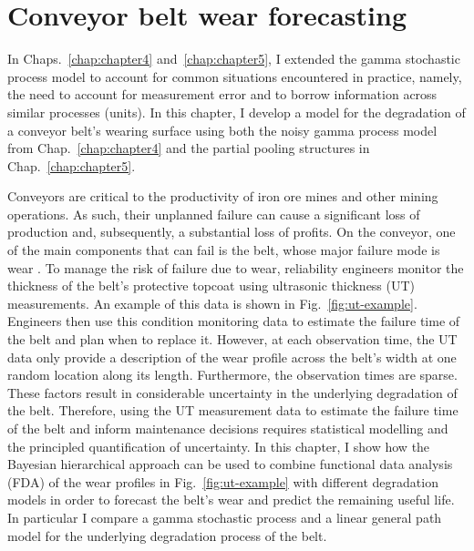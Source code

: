 \chapter{Conveyor belt wear forecasting} \label{chap:chapter6}

In Chaps.~\ref{chap:chapter4} and~\ref{chap:chapter5}, I extended the gamma stochastic process model to account for common situations encountered in practice, namely, the need to account for measurement error and to borrow information across similar processes (units). In this chapter, I develop a model for the degradation of a conveyor belt's wearing surface using both the noisy gamma process model from Chap.~\ref{chap:chapter4} and the partial pooling structures in Chap.~\ref{chap:chapter5}.

Conveyors are critical to the productivity of iron ore mines and other mining operations. As such, their unplanned failure can cause a significant loss of production and, subsequently, a substantial loss of profits. On the conveyor, one of the main components that can fail is the belt, whose major failure mode is wear \citep{bortnowski_2022}. To manage the risk of failure due to wear, reliability engineers monitor the thickness of the belt's protective topcoat using ultrasonic thickness (UT) measurements. An example of this data is shown in Fig.~\ref{fig:ut-example}. Engineers then use this condition monitoring data to estimate the failure time of the belt and plan when to replace it. However, at each observation time, the UT data only provide a description of the wear profile across the belt's width at one random location along its length. Furthermore, the observation times are sparse. These factors result in considerable uncertainty in the underlying degradation of the belt. Therefore, using the UT measurement data to estimate the failure time of the belt and inform maintenance decisions requires statistical modelling and the principled quantification of uncertainty. In this chapter, I show how the Bayesian hierarchical approach can be used to combine functional data analysis (FDA) of the wear profiles in Fig.~\ref{fig:ut-example} with different degradation models in order to forecast the belt's wear and predict the remaining useful life. In particular I compare a gamma stochastic process and a linear general path model for the underlying degradation process of the belt.

